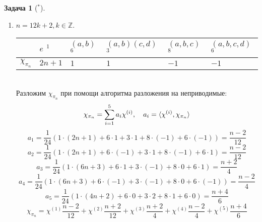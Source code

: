 \documentclass[12pt]{article}
\theoremstyle{definition}
\newtheorem{zad}{Задача}[section]
\begin{document}
\begin{zad}[$^*$]
\begin{itemize}
\begin{enumerate}
    \item $n=12k+2,k\in\mathbb{Z}$.
    \begin{table}[h!]
    \centering
    \begin{tabular}{|l|l|l|l|l|l|}
    \hline
     & $e$ $^1$ & $(a,b)$ $^6$ & $(a,b)(c,d)$ $^3$ & $(a,b,c)$ $^8$ & $(a,b,c,d)$ $^6$ \\ \hline
    $\chi_{\pi_n}$ & $2n+1$ & $1$ & $1$ & $-1$ & $-1$ \\ \hline
    \end{tabular}
    \end{table}\\
    Разложим $\chi_{\pi_n}$ при помощи алгоритма разложения на неприводимые:
    \begin{equation}
        \chi_{\pi_n}=\sum\limits_{i=1}^5 a_i\chi^{(i)},\quad a_i=\braket{\chi^{(i)},\chi_{\pi_n}}
    \end{equation}
    \begin{equation}
        a_1=\frac{1}{24}(1\cdot(2n+1)+6\cdot1+3\cdot1+8\cdot(-1)+6\cdot(-1))=\frac{n-2}{12}
    \end{equation}
    \begin{equation}
        a_2=\frac{1}{24}(1\cdot(2n+1)+6\cdot(-1)+3\cdot1+8\cdot(-1)+6\cdot1)=\frac{n-2}{12}
    \end{equation}
    \begin{equation}
        a_3=\frac{1}{24}(1\cdot(6n+3)+6\cdot1+3\cdot(-1)+8\cdot0+6\cdot1)=\frac{n+2}{4}
    \end{equation}
    \begin{equation}
        a_4=\frac{1}{24}(1\cdot(6n+3)+6\cdot(-1)+3\cdot(-1)+8\cdot0+6\cdot(-1))=\frac{n-2}{4}
    \end{equation}
    \begin{equation}
        a_5=\frac{1}{24}(1\cdot(4n+2)+6\cdot0+3\cdot2+8\cdot1+6\cdot0)=\frac{n+4}{6}
    \end{equation}
    \begin{equation}
        \boxed{\chi_{\pi_n}=\chi^{(1)}\frac{n-2}{12}+\chi^{(2)}\frac{n+2}{12}+\chi^{(3)}\frac{n+2}{4}+\chi^{(4)}\frac{n-2}{4}+\chi^{(5)}\frac{n+4}{6}}
    \end{equation}
    

\end{enumerate}
\end{itemize}
\end{zad}
\end{document}
